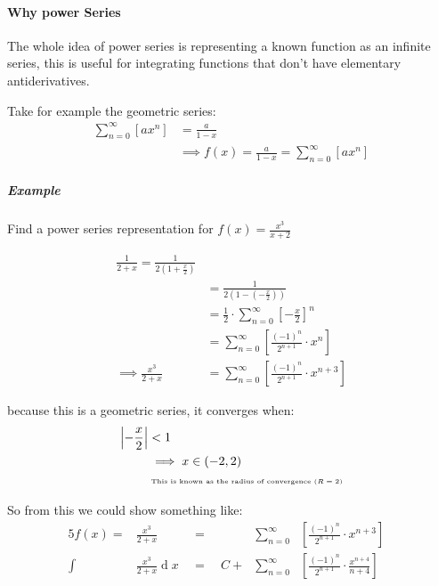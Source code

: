 \documentclass[class=article, crop=false]{standalone}
\begin{document}
\hypertarget{why-power-series}{%
\paragraph{Why power Series}\label{why-power-series}}

The whole idea of power series is representing a known function as an
infinite series, this is useful for integrating functions that don't
have elementary antiderivatives.

Take for example the geometric series:
\begin{align}
  \sum^{\infty}_{n= 0} \left[ ax^n \right] &= \frac{a}{1 - x}\\
  & \implies  f\left( x \right) = \frac{a}{1-x} = \sum^{\infty}_{n= 0} \left[ ax^n \right]
\end{align}

\hypertarget{example}{%
\subparagraph{Example}\label{example}}

Find a power series representation for
\(f\left( x \right) = \frac{x^3}{x + 2}\)

\begin{align}
  \frac{1}{2 +  x} =  \frac{1}{2\left( 1+ \frac{x}{2} \right) }\\
  &=  \frac{1}{2\left( 1 - \left( - \frac{x}{2} \right)  \right) }\\
  &= \frac{1}{2} \cdot \sum^{\infty}_{n= 0} \left[ - \frac{x}{2} \right] ^n\\
  &= \sum^{\infty}_{n= 0} \left[ \frac{\left( - 1 \right) ^n}{2^{n +  1}} \cdot  x^n \right] \\
  \implies   \frac{x^3}{2 +  x } &=  \sum^{\infty}_{n= 0} \left[ \frac{\left( -1  \right) ^n}{2^{n+ 1}}\cdot x^{n+ 3} \right]
\end{align}

 because this is a geometric series, it converges when:
\begin{align}
  \left| - \frac{x}{2} \right| &< 1\\
  & \implies  x \in \left( - 2, 2 \right)\\
 & \tiny{  \text{ This is known as the radius of convergence $\left( R= 2 \right) $} }
\end{align}

So from this we could show something like:
\begin{alignat}{5}
  f\left( x \right) = &\frac{x^3}{2+ x} &=& &\sum^{\infty}_{n= 0} &\left[ \frac{\left( - 1 \right) ^n}{2^{n+ 1}}\cdot x^{n+ 3} \right]&\\
  \int^{}_{} &\frac{x^3}{2+ x}  \operatorname{d}x \enspace  &=& \enspace C + &\sum^{\infty}_{n= 0} &\left[ \frac{\left( - 1 \right) ^n}{2^{n+ 1}} \cdot  \frac{x^{n+ 4}}{n+ 4} \right]   &
\end{alignat}
\end{document}
